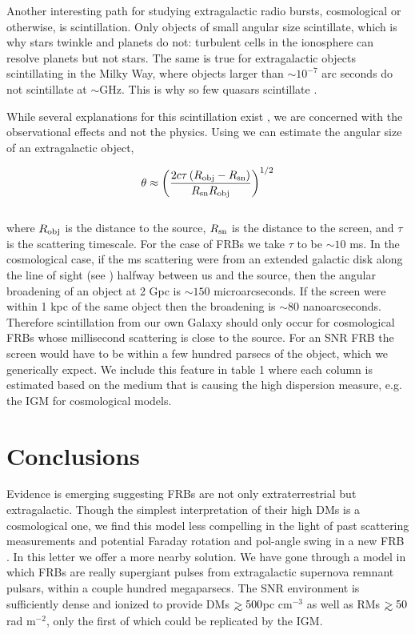 \documentclass[useAMS,usenatbib]{mn2e}
\def\gtrsim{\mathrel{\hbox{\rlap{\hbox{\lower4pt\hbox{$\sim$}}}\hbox{$>$}}}}
\begin{document}
Another interesting path for studying extragalactic radio bursts, 
cosmological or otherwise, is scintillation. Only objects of small angular
size scintillate, which is why stars twinkle and planets do not: turbulent cells
in the ionosphere can resolve planets but not stars. The same is true for extragalactic
objects scintillating in the Milky Way, where objects larger than $\sim10^{-7}$ 
arc seconds do not scintillate at $\sim$GHz. 
This is why so few quasars scintillate \citep{2002Natur.415...57D}. 

While several explanations for this scintillation exist 
\citep{1992RSPTA.341..151N, 2014MNRAS.442.3338P}, we are  
concerned with the observational effects and not the physics. 
Using \cite{1986isra.book.....T} 
we can estimate the angular size of an extragalactic object,

\begin{equation}
\label{eqn-scint}
\theta \approx \left ( \frac{2 c \tau \, (R_{\rm obj} - R_{\rm sn})}{R_{\rm sn}R_{\rm obj}} \right )^{1/2}
\end{equation}
\\

\noindent where $R_{\rm obj}$ is the distance to the source, $R_{\rm sn}$ is the distance 
to the screen, and $\tau$ is the scattering timescale. For the case of FRBs we 
take $\tau$ to be $\sim10$ ms. In the cosmological case, if the ms scattering
were from an extended galactic disk along the line of sight  (see \citet{2014ApJ...780L..33M})
halfway between
us and the source, then the angular broadening
of an object at 2 Gpc is $\sim150$ microarcseconds. If the screen were within 
1 kpc of the same object then the broadening is $\sim80$ nanoarcseconds. 
Therefore scintillation from our own Galaxy should only occur for cosmological 
FRBs whose millisecond scattering is close to the source. For an SNR FRB the 
screen would have to be within a few hundred parsecs of the object, which we 
generically expect. We include this feature in table 1 where each 
column is estimated based on the medium that is causing the high dispersion measure, 
e.g. the IGM for cosmological models.

\section{Conclusions}
Evidence is emerging suggesting FRBs are not only extraterrestrial
but extragalactic. Though the simplest interpretation of their high DMs 
is a cosmological one, we find this model less compelling in the light of 
past scattering measurements and potential Faraday rotation 
and pol-angle swing in a new FRB 
\citep{2015arXiv151200529M}. In this letter we offer a 
more nearby solution. 
We have gone through
a model in which FRBs are really supergiant pulses from 
extragalactic supernova remnant pulsars, within a couple hundred megaparsecs. 
The SNR environment is sufficiently
dense and ionized to provide DMs $\gtrsim 500$pc cm$^{-3}$ as well as 
RMs $\gtrsim 50$ rad m$^{-2}$, only the first of which could be replicated by the IGM. 
\end{document}
